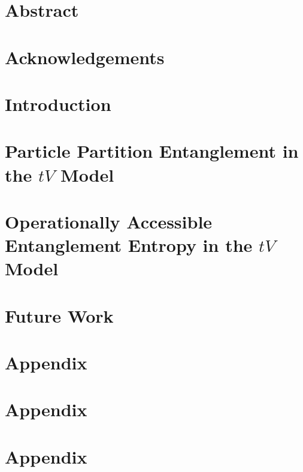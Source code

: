 \documentclass[12pt, two sided]{report}
\begin{document}



\chapter*{Abstract}


\chapter*{Acknowledgements}


\setcounter{page}{2}

\singlespacing
\tableofcontents
\doublespacing

\chapter{Introduction}



\chapter{Particle Partition Entanglement in the $tV$ Model}


\chapter{Operationally Accessible Entanglement Entropy in the $tV$ Model}


\chapter{Future Work}


\appendix
\chapter{Appendix}


\chapter{Appendix}


\chapter{Appendix}


{} 

\end{document}
